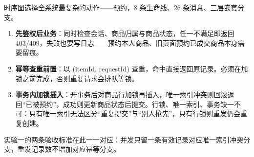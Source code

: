 时序图选择全系统最复杂的动作——预约，8 条生命线、26 条消息、三层嵌套分支。

\begin{enumerate}[leftmargin=2em,itemsep=1pt]
  \item \textbf{先鉴权后业务}：同时检查会话、商品归属与商品状态，任一不满足即返回 403/409，失败也要写日志——预约本人商品、旧页面预约已成交商品本身需要留痕。
  \item \textbf{幂等查重前置}：以 (itemId, requestId) 查重，命中直接返回原记录。必须在加锁之前完成，否则重复请求会排队等锁。
  \item \textbf{事务内加锁插入}：开事务后对商品行加锁再插入，唯一索引冲突则回滚返回“已被预约”，成功则更新商品状态后提交。行锁、唯一索引、事务缺一不可：只有唯一索引无法区分“重复提交”与“别人抢先”，只有行锁则重发仍会重复创建。
\end{enumerate}

实验一的两条验收标准在此一一对应：并发只留一条有效记录对应唯一索引冲突分支，重发记录数不增加对应幂等分支。
